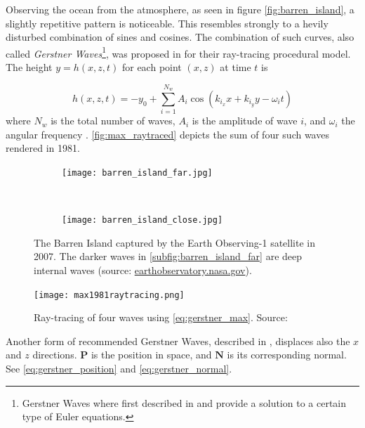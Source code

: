 Observing the ocean from the atmosphere, as seen in figure
\autoref{fig:barren_island}, a slightly repetitive pattern is noticeable. This
resembles strongly to a hevily disturbed combination of sines and cosines. The
combination of such curves, also called \textit{Gerstner
Waves}\footnote{Gerstner Waves where first described in
\autocite{gerstner1802theorie} and provide a solution to a certain type of
Euler equations.}, was proposed in \autocite{max1981vectorized} for their
ray-tracing procedural model. The height $y = h(x,z,t)$ for each point $(x,z)$
at time $t$ is

\begin{equation}\label{eq:gerstner_max}
    h(x, z, t) = -y_0 + \sum_{i = 1}^{N_w} A_i \cos(k_{i_x}x + k_{i_y}y -
    \omega_i t)
\end{equation}
%
where $N_w$ is the total number of waves, $A_i$ is the amplitude of wave $i$,
and $\omega_i$ the angular frequency
\autocite{max1981vectorized,darles2011survey}. \autoref{fig:max_raytraced}
depicts the sum of four such waves rendered in 1981.

\begin{figure}[h!]
    \centering
    \begin{subfigure}[h]{\textwidth}
        \centering
        \texttt{[image: barren\_island\_far.jpg]}
        \label{subfig:barren_island_far}
    \end{subfigure}\\%
    \begin{subfigure}[h]{\textwidth}
        \centering
        \texttt{[image: barren\_island\_close.jpg]}
        \label{subfig:barren_island_close}
    \end{subfigure}
    \caption{The Barren Island captured by the Earth Observing-1 satellite in
        2007. The darker waves in \autoref{subfig:barren_island_far} are
        deep internal waves (source:
        \url{earthobservatory.nasa.gov}).}\label{fig:barren_island}
\end{figure}

\begin{figure}[h]
    \centering
    \texttt{[image: max1981raytracing.png]}
    \caption{Ray-tracing of four waves using \autoref{eq:gerstner_max}. Source:
    \autocite{max1981vectorized}}\label{fig:max_raytraced}
\end{figure}

Another form of recommended Gerstner Waves, described in
\autocite[Chapter~1]{fernando2004gpu}, displaces also the $x$ and $z$
directions. $\textbf{P}$ is the position in space, and $\textbf{N}$ is its
corresponding normal. See \autoref{eq:gerstner_position} and
\autoref{eq:gerstner_normal}.

